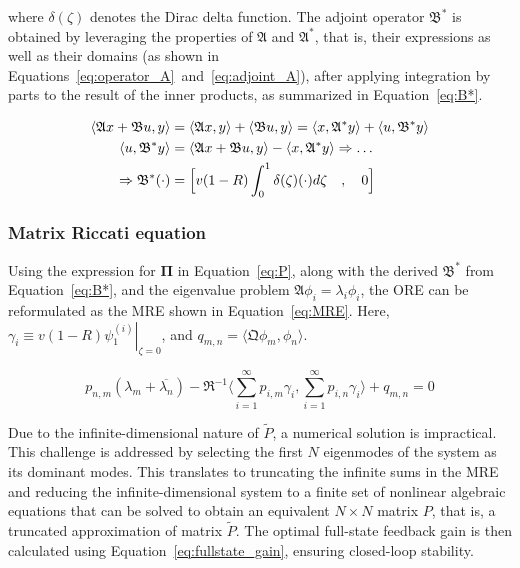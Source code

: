 where $\delta(\zeta)$ denotes the Dirac delta function. The adjoint operator $\mathfrak{B}^*$ is obtained by leveraging the properties of $\mathfrak{A}$ and $\mathfrak{A}^*$, that is, their expressions as well as their domains (as shown in Equations~\ref{eq:operator_A}~and~\ref{eq:adjoint_A}), after applying integration by parts to the result of the inner products, as summarized in Equation~\ref{eq:B*}.

\begin{equation} \label{eq:B*}
    \begin{aligned}
        \langle \mathfrak{A} {x} + \mathfrak{B} u, {y} \rangle
        &= \langle \mathfrak{A} {x}, {y} \rangle
        + \langle \mathfrak{B} u, {y} \rangle
        = \langle {x}, \mathfrak{A}^* {y}\rangle
        + \langle u, \mathfrak{B}^* {y} \rangle \\
        \langle u, \mathfrak{B}^* {y} \rangle
        &= \langle \mathfrak{A} {x} + \mathfrak{B} u, {y} \rangle
        - \langle {x}, \mathfrak{A}^* {y}\rangle
        \Rightarrow \hdots \\ \Rightarrow \mathfrak{B}^* (\cdot) &= \Bigl[ v(1-R) \int_0^1 \delta(\zeta) (\cdot) d\zeta \quad , \quad 0 \Bigr]
    \end{aligned}
\end{equation}

\subsubsection{Matrix Riccati equation}

Using the expression for $\mathbf{\Pi}$ in Equation~\ref{eq:P}, along with the derived $\mathfrak{B}^*$ from Equation~\ref{eq:B*}, and the eigenvalue problem $\mathfrak{A}{\phi_i} = \lambda_i {\phi_i}$, the ORE can be reformulated as the MRE shown in Equation~\ref{eq:MRE}. Here, $\gamma_i \equiv v(1-R) \left. \psi_{1}^{(i)} \right|_{\zeta = 0}$, and $q_{m,n} = \langle \mathfrak{Q} {\phi_m}, {\phi_n} \rangle$.

\begin{equation}\label{eq:MRE}
    p_{n,m} (\lambda_m + \overline{\lambda_n})
    - \mathfrak{R}^{-1} \langle \sum_{i=1}^\infty p_{i,m} \gamma_i, \sum_{i=1}^\infty p_{i,n} \gamma_i \rangle
    + q_{m,n} = 0
\end{equation}

Due to the infinite-dimensional nature of $\tilde{P}$, a numerical solution is impractical. This challenge is addressed by selecting the first $N$ eigenmodes of the system as its dominant modes. This translates to truncating the infinite sums in the MRE and reducing the infinite-dimensional system to a finite set of nonlinear algebraic equations that can be solved to obtain an equivalent $N \times N$ matrix $P$, that is, a truncated approximation of matrix $\tilde{P}$. The optimal full-state feedback gain is then calculated using Equation~\ref{eq:fullstate_gain}, ensuring closed-loop stability.

